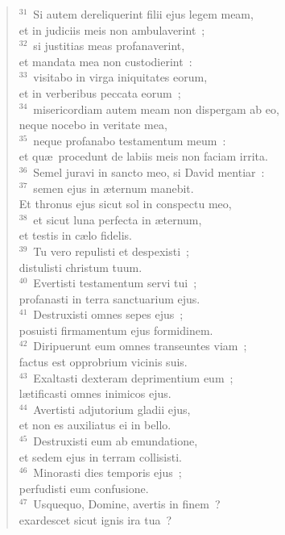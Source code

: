 \begin{flushleft}
\begin{verse}
${}^{31}$~Si autem dereliquerint filii ejus legem meam,\\ et in judiciis meis non ambulaverint~;\\
${}^{32}$~si justitias meas profanaverint,\\ et mandata mea non custodierint~:\\
${}^{33}$~visitabo in virga iniquitates eorum,\\ et in verberibus peccata eorum~;\\
${}^{34}$~misericordiam autem meam non dispergam ab eo,\\ neque nocebo in veritate mea,\\
${}^{35}$~neque profanabo testamentum meum~:\\ et qu\ae\ procedunt de labiis meis non faciam irrita.\\
${}^{36}$~Semel juravi in sancto meo, si David mentiar~:\\
${}^{37}$~semen ejus in \ae ternum manebit.\\ Et thronus ejus sicut sol in conspectu meo,\\
${}^{38}$~et sicut luna perfecta in \ae ternum,\\ et testis in c\ae lo fidelis.\\
${}^{39}$~Tu vero repulisti et despexisti~;\\ distulisti christum tuum.\\
${}^{40}$~Evertisti testamentum servi tui~;\\ profanasti in terra sanctuarium ejus.\\
${}^{41}$~Destruxisti omnes sepes ejus~;\\ posuisti firmamentum ejus formidinem.\\
${}^{42}$~Diripuerunt eum omnes transeuntes viam~;\\ factus est opprobrium vicinis suis.\\
${}^{43}$~Exaltasti dexteram deprimentium eum~;\\ l\ae tificasti omnes inimicos ejus.\\
${}^{44}$~Avertisti adjutorium gladii ejus,\\ et non es auxiliatus ei in bello.\\
${}^{45}$~Destruxisti eum ab emundatione,\\ et sedem ejus in terram collisisti.\\
${}^{46}$~Minorasti dies temporis ejus~;\\ perfudisti eum confusione.\\
${}^{47}$~Usquequo, Domine, avertis in finem~?\\ exardescet sicut ignis ira tua~?\\

\end{verse}
\end{flushleft}
